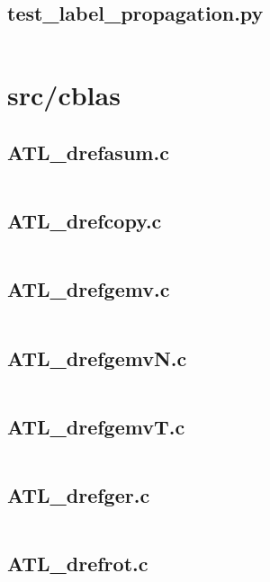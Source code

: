 \documentclass{article}
\begin{document}
\subsection{test\_label\_propagation.py}
\inputminted{python}{/home/dufferzafar/dev/@clones/scikit-learn/sklearn/semi_supervised/tests/test_label_propagation.py}
\newpage

\section{src/cblas}

\subsection{ATL\_drefasum.c}
\inputminted{c}{/home/dufferzafar/dev/@clones/scikit-learn/sklearn/src/cblas/ATL_drefasum.c}
\newpage

\subsection{ATL\_drefcopy.c}
\inputminted{c}{/home/dufferzafar/dev/@clones/scikit-learn/sklearn/src/cblas/ATL_drefcopy.c}
\newpage

\subsection{ATL\_drefgemv.c}
\inputminted{c}{/home/dufferzafar/dev/@clones/scikit-learn/sklearn/src/cblas/ATL_drefgemv.c}
\newpage

\subsection{ATL\_drefgemvN.c}
\inputminted{c}{/home/dufferzafar/dev/@clones/scikit-learn/sklearn/src/cblas/ATL_drefgemvN.c}
\newpage

\subsection{ATL\_drefgemvT.c}
\inputminted{c}{/home/dufferzafar/dev/@clones/scikit-learn/sklearn/src/cblas/ATL_drefgemvT.c}
\newpage

\subsection{ATL\_drefger.c}
\inputminted{c}{/home/dufferzafar/dev/@clones/scikit-learn/sklearn/src/cblas/ATL_drefger.c}
\newpage

\subsection{ATL\_drefrot.c}
\inputminted{c}{/home/dufferzafar/dev/@clones/scikit-learn/sklearn/src/cblas/ATL_drefrot.c}
\newpage
\end{document}
